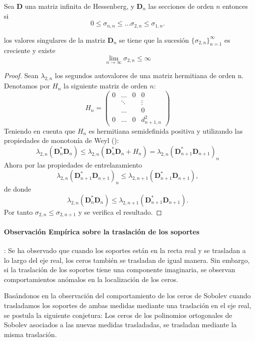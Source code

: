 \begin{proposition} Sea $\mathbf{D}$ una matriz infinita de Hessenberg, y $\mathbf{D}_n$ las secciones de orden $n$ entonces si $$
		0 \leq \sigma_{n,n}\leq \dots \sigma_{2,n} \leq \sigma_{1,n}.
	$$

	\noindent los valores singulares de la matriz $\mathbf{D}_n$ se tiene que
	la sucesión $\{\sigma_{2,n}\}_{n=1}^{\infty}$ es creciente y existe
	$$
		\lim_{n\to \infty} \sigma_{2,n} \leq \infty
	$$


\end{proposition}

\begin{proof}
	Sean $\lambda_{2,n}$ los segundos autovalores de una   matriz hermitiana de orden n. Denotamos por $H_n$  la siguiente matriz de orden $n$:
	\[
		H_n=\begin{pmatrix}
			0 & \ldots & 0 & 0           \\
			  & \ddots &   & \vdots      \\
			  & \dots  &   & 0           \\
			0 & \dots  & 0 & d_{n+1,n}^2
		\end{pmatrix}
	\]
	Teniendo en cuenta que $H_n$ es hermitiana semidefinida positiva y utilizando las propiedades de monotonía de Weyl (\cite{Bhatia1997}):
	\[
		\lambda_{2,n} (\mathbf{D}_n^{*}\mathbf{D}_n) \leq  \lambda_{2,n}(\mathbf{D}_n^{*}\mathbf{D}_n +H_n)=\lambda_{2,n}(
		\mathbf{D}_{n+1}^{*}\mathbf{D}_{n+1})_{n}   \]
	Ahora por las propiedades de entrelazamiento
	\[
		\lambda_{2,n}(
		\mathbf{D}_{n+1}^{*}\mathbf{D}_{n+1})_{n} \leq \lambda_{2,n+1}(
		\mathbf{D}_{n+1}^{*}\mathbf{D}_{n+1}), \]
	de donde
	\[
		\lambda_{2,n}(\mathbf{D}_n^{*}\mathbf{D}_n) \leq \lambda_{2,n+1}(
		\mathbf{D}_{n+1}^{*}\mathbf{D}_{n+1}). \] Por tanto $\sigma_{2,n}\leq\sigma_{2,n+1}$  y se verifica el resultado.
\end{proof}

\paragraph{Observación Empírica sobre la traslación de los soportes}: Se ha observado que cuando los soportes están en la recta real y se trasladan a lo largo del eje real, los ceros también se trasladan de igual manera. Sin embargo, si la traslación de los soportes tiene una componente imaginaria, se observan comportamientos anómalos en la localización de los ceros.

\begin{conjetura}
	Basándonos en la observación del comportamiento de los ceros de Sobolev cuando trasladamos los soportes de ambas medidas mediante una traslación en el eje real, se postula la siguiente conjetura:
	\label{conj:zeros_sobolev_translation}
	Los ceros de los polinomios ortogonales de Sobolev asociados a las nuevas medidas trasladadas, se trasladan mediante la misma traslación.
\end{conjetura}


